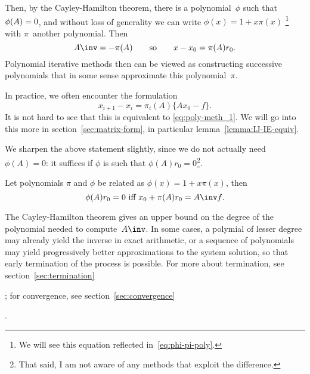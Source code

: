 Then, by the Cayley-Hamilton theorem,
there is a polynomial~$\phi$ such that $\phi(A)=\nobreak0$, and without
loss of generality we can write $\phi(x)=1+x\pi(x)$%
\footnote{We will see this equation reflected in~\eqref{eq:phi-pi-poly}.}
with $\pi$~another polynomial. Then
        \[ A\inv=-\pi(A)\qquad\hbox{so}\qquad  x-x_0=\pi(A)r_0. \]
Polynomial iterative methods then can be viewed as constructing
successive polynomials
that in some sense approximate this polynomial~$\pi$.

\begin{remark}
In practice, we often encounter the formulation
\[ x_{i+1}-x_i=\pi_i(A)\{Ax_0-f\}. \]
It is not hard to see that this is equivalent to
\eqref{eq:poly-meth_1}. We will go into this more in
section~\ref{sec:matrix-form}, in particular
lemma~\ref{lemma:IJ-IE-equiv}.
\end{remark}

\begin{truth}
We sharpen the above statement slightly, since we do not actually
need $\phi(A)=0$: it suffices if $\phi$ is such that $\phi(A)r_0=0$\footnote
{That said, I am not aware of any methods that exploit the difference.}.
\begin{theorem}
\label{th:solution}
Let polynomials $\pi$ and $\phi$ be related as $\phi(x)=1+x\pi(x)$, then
\[ \hbox{$\phi(A)r_0=0$ iff $x_0+\pi(A)r_0=A\inv f$}. \]
\end{theorem}
\end{truth}

The Cayley-Hamilton theorem gives an upper bound on the degree of the
polynomial needed to compute~$A\inv$. In some cases, a polymial of
lesser degree may already yield the inverse in exact arithmetic, or a
sequence of polynomials may yield progressively better approximations
to the system solution, so that early termination of the process is
possible.  For more about termination, see
section~\ref{sec:termination}%
\begin{truth}
; for convergence, see
section~\ref{sec:convergence}
\end{truth}
.

\begin{comment}
Next we will define polynomial sequences independent of the particular
choices for $A$, $\{\pi_i\}$, and~$f$, but only dependent on a
solution vector.
\begin{ddefinition}{Polynomial sequence for a solution}
A sequence $\{x_i\}_{i\geq1}$
is called a polynomial sequence for the vector~$x$
if it is a polynomial method $\Pmethod$,
where $A$~and~$f$ are such that $A x=f$.
The vector $ x$ is called the {\it solution vector} of the
sequence.
\end{ddefinition}
\end{comment}

